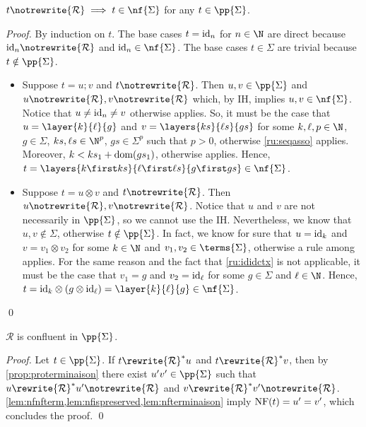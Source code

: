 \begin{lemma}\label{lem:nfterminaison}
    $t\notrewrite{\mathcal{R}}\implies t\in \nf{\Sigma}$ for any $t\in \pp{\Sigma}$.
\end{lemma}
\begin{proof}
    By induction on $t$. The base cases $t=\textup{id}_n$ for $n\in\N$ are direct because $\textup{id}_n\notrewrite{\mathcal{R}}$ and $\textup{id}_n\in \nf{\Sigma}$. The base cases $t\in\Sigma$ are trivial because $t\notin \pp{\Sigma}$.
    \begin{itemize}
        \item Suppose $t=u\semicolon v$ and $t\notrewrite{\mathcal{R}}$. Then $u,v\in \pp{\Sigma}$ and $u\notrewrite{\mathcal{R}},v\notrewrite{\mathcal{R}}$ which, by IH, implies $u,v\in \nf{\Sigma}$. Notice that $u\ne\textup{id}_n\ne v$ otherwise  applies. So, it must be the case that $u=\layer{k}{\ell}{g}$ and $v=\layers{ks}{\ell s}{gs}$ for some $k,\ell,p\in\N$, $g\in\Sigma$, $ks,\ell s\in\N^p$, $gs\in\Sigma^p$ such that $p>0$, otherwise \eqref{ru:seqasso} applies. Moreover, $k<ks_1+\textup{dom}(gs_1)$, otherwise  applies. Hence, $t=\layers{k\first ks}{\ell\first \ell s}{g\first gs}\in \nf{\Sigma}$.
        \item Suppose $t=u\otimes v$ and $t\notrewrite{\mathcal{R}}$. Then $u\notrewrite{\mathcal{R}},v\notrewrite{\mathcal{R}}$. Notice that $u$ and $v$ are not necessarily in $\pp{\Sigma}$, so we cannot use the IH. Nevertheless, we know that $u,v\notin\Sigma$, otherwise $t\notin \pp{\Sigma}$. In fact, we know for sure that $u=\textup{id}_k$ and $v=v_1\otimes v_2$ for some $k\in\N$ and $v_1,v_2\in\terms{\Sigma}$, otherwise a rule among  applies. For the same reason and the fact that \eqref{ru:ididctx} is not applicable, it must be the case that $v_1=g$ and $v_2=\textup{id}_\ell$ for some $g\in\Sigma$ and $\ell\in\N$. Hence, $t=\textup{id}_k\otimes(g\otimes\textup{id}_\ell)=\layer{k}{\ell}{g}\in \nf{\Sigma}$.
    \end{itemize} \qed
\end{proof}

\begin{proposition}\label{prop:proconfluence}
    $\mathcal{R}$ is confluent in $\pp{\Sigma}$.
\end{proposition}
\begin{proof}
    Let $t\in \pp{\Sigma}$. If $t\rewrite{\mathcal{R}}^*u$ and $t\rewrite{\mathcal{R}}^*v$, then by \cref{prop:proterminaison} there exist $u'v'\in\pp{\Sigma}$ such that $u\rewrite{\mathcal{R}}^*u'\notrewrite{\mathcal{R}}$ and $v\rewrite{\mathcal{R}}^*v'\notrewrite{\mathcal{R}}$. \cref{lem:nfnfterm,lem:nfispreserved,lem:nfterminaison} imply $\textup{NF}(t)=u'=v'$, which concludes the proof. \qed
\end{proof}

